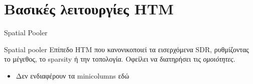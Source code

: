 \documentclass[11pt,center]{beamer}
\begin{document}
\section{Βασικές λειτουργίες HTM}

\begin{frame}{Spatial Pooler}
  \begin{block}{Spatial pooler}
    Επίπεδο HTM που κανονικοποιεί τα εισερχόμενα SDR, ρυθμίζοντας το μέγεθος, το sparsity ή την τοπολογία.
    Οφείλει να διατηρήσει τις \emph{ομοιότητες}.
    \begin{itemize}
      \item Δεν ενδιαφέρουν τα minicolumns εδώ
    \end{itemize}
  \end{block}

\end{frame}
\end{document}
